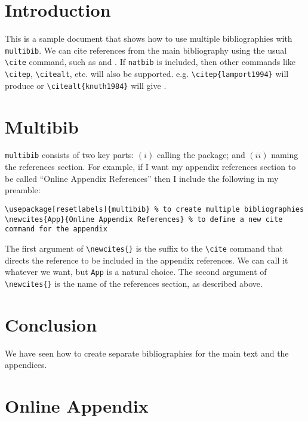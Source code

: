 \documentclass{article}
\begin{document}
\section{Introduction}

This is a sample document that shows how to use multiple bibliographies with \texttt{multibib}. We can cite references from the main bibliography using the usual \verb|\cite| command, such as \cite{lamport1994} and \cite{knuth1984}. If \verb|natbib| is included, then other commands like \verb|\citep|, \verb|\citealt|, etc. will also be supported. e.g. \verb|\citep{lamport1994}| will produce \citep{lamport1994} or \verb|\citealt{knuth1984}| will give \citealt{knuth1984}.

\section{Multibib}
\verb|multibib| consists of two key parts: $(i)$ calling the package; and $(ii)$ naming the references section. For example, if I want my appendix references section to be called ``Online Appendix References'' then I include the following in my preamble:

\begin{verbatim}
\usepackage[resetlabels]{multibib} % to create multiple bibliographies
\newcites{App}{Online Appendix References} % to define a new cite command for the appendix   
\end{verbatim}

The first argument of \verb|\newcites{}| is the suffix to the \verb|\cite| command that directs the reference to be included in the appendix references. We can call it whatever we want, but \verb|App| is a natural choice. The second argument of \verb|\newcites{}| is the name of the references section, as described above.


\section{Conclusion}

We have seen how to create separate bibliographies for the main text and the appendices.




\appendix

\clearpage


\section{Online Appendix}
\end{document}
